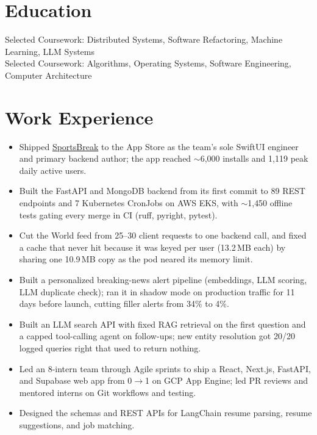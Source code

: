 \documentclass[11pt, letterpaper]{article}
\begin{document}

\section{Education}
Selected Coursework: Distributed Systems, Software Refactoring, Machine Learning, LLM Systems\\[1pt]
Selected Coursework: Algorithms, Operating Systems, Software Engineering, Computer Architecture

\section{Work Experience}
\begin{itemize}
  \item Shipped \href{https://apps.apple.com/app/id6762649287}{SportsBreak} to the App Store as the team's sole SwiftUI engineer and primary backend author; the app reached $\sim$6{,}000 installs and 1{,}119 peak daily active users.
  \item Built the FastAPI and MongoDB backend from its first commit to 89 REST endpoints and 7 Kubernetes CronJobs on AWS EKS, with $\sim$1{,}450 offline tests gating every merge in CI (ruff, pyright, pytest).
  \item Cut the World feed from 25--30 client requests to one backend call, and fixed a cache that never hit because it was keyed per user (13.2\,MB each) by sharing one 10.9\,MB copy as the pod neared its memory limit.
  \item Built a personalized breaking-news alert pipeline (embeddings, LLM scoring, LLM duplicate check); ran it in shadow mode on production traffic for 11 days before launch, cutting filler alerts from 34\% to 4\%.
  \item Built an LLM search API with fixed RAG retrieval on the first question and a capped tool-calling agent on follow-ups; new entity resolution got 20/20 logged queries right that used to return nothing.
\end{itemize}

\vspace{1pt}
\begin{itemize}
  \item Led an 8-intern team through Agile sprints to ship a React, Next.js, FastAPI, and Supabase web app from 0$\to$1 on GCP App Engine; led PR reviews and mentored interns on Git workflows and testing.
  \item Designed the schemas and REST APIs for LangChain resume parsing, resume suggestions, and job matching.
\end{itemize}
\end{document}
